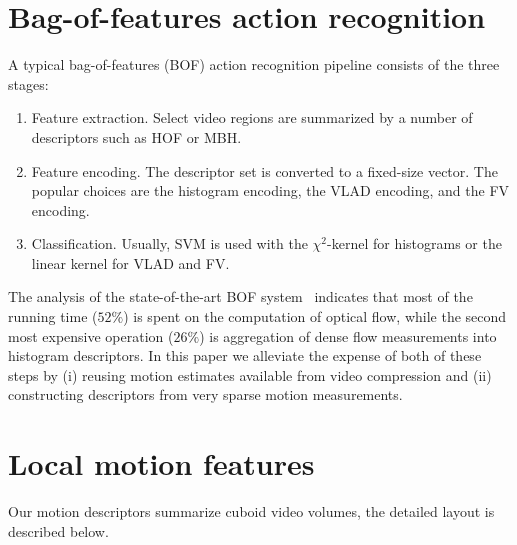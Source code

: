 \documentclass[10pt,twocolumn,letterpaper]{article}
\begin{document}
\section{Bag-of-features action recognition}
A typical bag-of-features (BOF) action recognition pipeline
consists of the three stages:
\begin{enumerate}
\item Feature extraction. Select video regions are summarized by
a number of descriptors such as HOF or MBH.
\item Feature encoding. The descriptor set is converted to a
fixed-size vector. The popular choices are the histogram
encoding, the VLAD encoding, and the FV encoding.
\item Classification. Usually, SVM is used with the
$\chi^2$-kernel for histograms or the linear kernel for VLAD and
FV.
\end{enumerate}

The analysis of the state-of-the-art BOF system~\cite{Wang12}
indicates that most of the running time ($52\%$) is spent on the
computation of optical flow, while the second most expensive
operation ($26\%$) is aggregation of dense flow measurements
into histogram descriptors. In this paper we alleviate the
expense of both of these steps by (i) reusing motion estimates
available from video compression and (ii) constructing
descriptors from very sparse motion measurements.

\section{Local motion features}
\label{sec:features}
Our motion descriptors summarize cuboid video volumes, the
detailed layout is described below.
\end{document}
